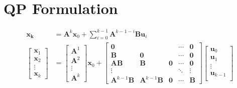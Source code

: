 \documentclass{article}
\begin{document}
\section{QP Formulation}
$$
\begin{aligned}
    \bm{x_k} &= \mathbf A^k\bm x_0 + \sum_{i=0}^{k-1}\mathbf{A}^{k-1-i}\mathbf B \mathbf u_i\\
    \left[
        \begin{array}{c}
            \bm x_1\\
            \bm x_2\\
            \vdots \\
            \bm x_k
        \end{array}
    \right]
    &=
    \left[
        \begin{array}{c}
            \mathbf A^1\\
            \mathbf A^2\\
            \vdots\\
            \mathbf A^k
        \end{array}
    \right]
    \bm x_0
    +
    \left[
        \begin{array}{ccccc}
            \bm 0 & & &\cdots & \bm 0\\
            \mathbf B & \bm 0 && \cdots & \bm 0\\
            \mathbf{AB} & \mathbf B & \bm 0 & \cdots & \bm 0\\
            \vdots & & & \ddots & \vdots\\
            \mathbf{A}^{k-1}\mathbf B & \mathbf{A}^{k-1}\mathbf B & \bm 0 & \cdots & \mathbf B
        \end{array}
    \right]
    \left[
        \begin{array}{c}
            \mathbf u_0\\
            \mathbf u_1\\
            \vdots\\
            \mathbf u_{k-1}\\
        \end{array}
    \right]
\end{aligned}
$$
\end{document}
